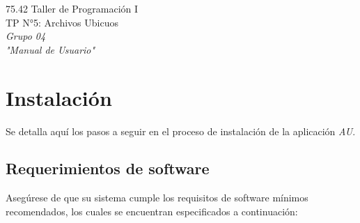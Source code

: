 \documentclass{article}
\begin{document}
\setcounter{page}{5}



\begin{titlepage}
	\vspace*{\fill}
	\begin{center}
		\Large 75.42 Taller de Programación I \\
		\Huge TP N°5: Archivos Ubicuos \\
		\bigskip\huge\textit{Grupo 04} \\
		\bigskip\bigskip\bigskip\bigskip\bigskip\bigskip
		\bigskip\bigskip\bigskip\bigskip\bigskip\bigskip\bigskip
		\medskip\huge\textit{"Manual de Usuario"} \\
		\date{}
	\end{center}
	\vspace*{\fill}
\end{titlepage}
\newpage




\tableofcontents
\newpage
{}




\section{Instalación}
	
	Se detalla aquí los pasos a seguir en el proceso de instalación de la aplicación \textit{AU}.
\bigskip



\subsection{Requerimientos de software}
	
	Asegúrese de que su sistema cumple los requisitos de software mínimos recomendados, los cuales se encuentran especificados a continuación:
	\medskip
\end{document}
